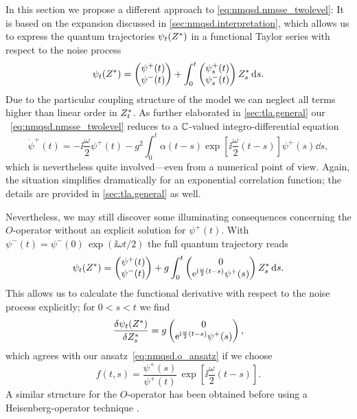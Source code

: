 In this section we propose a different approach to \autoref{eq:nmqsd.nmsse_twolevel}:
It is based on the expansion discussed in \autoref{sec:nmqsd.interpretation}, which allows us to express the quantum trajectories $\psitZ$ in a functional Taylor series with respect to the noise process
\begin{equation*}
  \psitZ = \twovec{\psi^+(t)}{\psi^-(t)} + \int_0^t \twovec{\psi^+_s(t)}{\psi^-_s(t)} \ZZ_s \dd s.
\end{equation*}
Due to the particular coupling structure of the model we can neglect all terms higher than linear order in ${Z}^*_t$.
As further elaborated in \autoref{sec:tla.general} our \NMSSE~\ref{eq:nmqsd.nmsse_twolevel} reduces to a $\mathbb{C}$-valued integro-differential equation
\begin{equation}
  \dot\psi^+(t) = -\ii \frac{\omega}{2} \psi^+(t) - g^2 \int_0^t \alpha(t - s) \exp[\ii \frac{\omega}{2} (t - s)] \psi^+(s) \dd s,
  \label{eq:nmqsd.dotpsi_plus}
\end{equation}
which is nevertheless quite involved---even from a numerical point of view.
Again, the situation simplifies dramatically for an exponential correlation function; the details are provided in \autoref{sec:tla.general} as well.

Nevertheless, we may still discover some illuminating consequences concerning the $O$-operator without an explicit solution for $\psi^+(t)$.
With $\psi^-(t) = \psi^-(0) \, \exp(\ii \omega t / 2)$ the full quantum trajectory reads
\begin{equation}
  \psi_t(\ZZ) = \twovec{\psi^+(t)}{\psi^-(t)} + g \int_0^t \twovec{0}{\exp[\ii \frac{\omega}{2} (t-s)] \psi^+(s)} \ZZ_s \dd s.
  \label{eq:nmqsd.solution}
\end{equation}
This allows us to calculate the functional derivative with respect to the noise process explicitly; for $0 < s < t$ we find
\begin{equation*}
  \frac{\delta \psi_t(\ZZ)}{\delta \ZZ_s} = g \twovec{0}{\exp[\ii \frac{\omega}{2} (t-s)] \psi^+(s)},
\end{equation*}
which agrees with our ansatz~\ref{eq:nmqsd.o_ansatz} if we choose
\begin{equation}
  f(t, s) = \frac{\psi^+(s)}{\psi^+(t)} \, \exp[\ii \frac{\omega}{2}(t - s)].
  \label{eq:nmqsd.o_ansatz_psi}
\end{equation}
A similar structure for the $O$-operator has been obtained before using a Heisenberg-operator technique \cite{St01_habil}.\\

